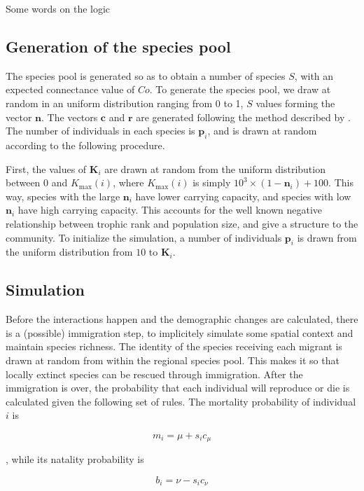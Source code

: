 \documentclass[10pt,twocolumn,fleqn]{article}
\begin{document}
Some words on the logic

\subsection{Generation of the species pool}

The species pool is generated so as to obtain a number of species $S$, with an
expected connectance value of $Co$. To generate the species pool, we draw at
random in an uniform distribution ranging from 0 to 1, $S$ values forming the
vector $\mathbf{n}$. The vectors $\mathbf{c}$ and $\mathbf{r}$ are generated
following the method described by \textcite{williams_simple_2000}. The number of
individuals in each species is $\mathbf{p}_i$, and is drawn at random according
to the following procedure.

First, the values of $\mathbf{K}_i$ are drawn at random from the
uniform distribution between 0 and $K_{\mathrm{max}}(i)$, where
$K_{\mathrm{max}}(i)$ is simply $10^3\times(1-\mathbf{n}_i)+100$. This way,
species with the large $\mathbf{n}_i$ have lower carrying capacity, and
species with low $\mathbf{n}_i$ have high carrying capacity. This accounts for
the well known negative relationship between trophic rank and population size,
and give a structure to the community.
To initialize the simulation, a number of individuals $\mathbf{p}_i$ is drawn
from the uniform distribution from $10$ to $\mathbf{K}_i$.

\subsection{Simulation}

Before the interactions happen and the demographic changes are calculated,
there is a (possible) immigration step, to implicitely simulate some spatial
context and maintain species richness. The identity of the species receiving
each migrant is drawn at random from within the regional species pool. This
makes it so that locally extinct species can be rescued through immigration.
After the immigration is over, the probability that each individual will
reproduce or die is calculated given the following set of rules. The mortality
probability of individual $i$ is

\begin{equation}
	m_i = \mu+s_ic_\mu
\end{equation}

\noindent, while its natality probability is 

\begin{equation}
	b_i = \nu-s_ic_\nu
\end{equation}
\end{document}
